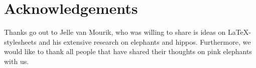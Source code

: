 \section{Acknowledgements}
\label{sec:Acknowledgements}

Thanks go out to Jelle van Mourik, who was willing to share is ideas on \LaTeX-stylesheets and his extensive research on elephants and hippos. Furthermore, we would like to thank all people that have shared their thoughts on pink elephants with us.
